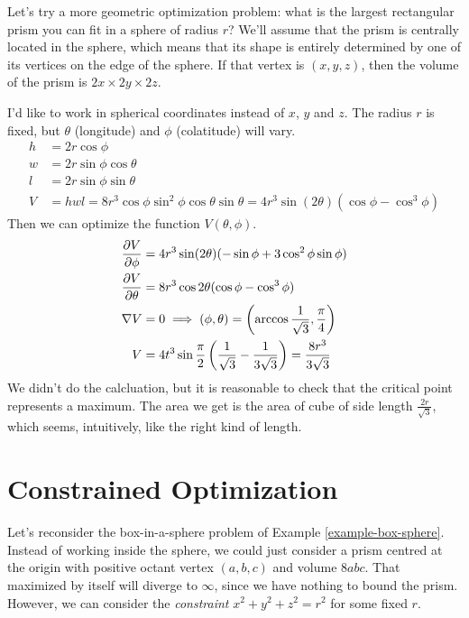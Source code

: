 \documentclass[fleqn,letterpaper]{report}
\begin{document}
\begin{example}
\label{example-box-sphere}
Let's try a more geometric optimization problem: what is the
largest rectangular prism you can fit in a sphere of radius
$r$? We'll assume that the prism is centrally located in the
sphere, which means that its shape is entirely determined by
one of its vertices on the edge of the sphere. If that vertex
is $(x,y,z)$, then the volume of the prism is $2x \times 2y
\times 2z$. 

I'd like to work in spherical coordinates instead of $x$, $y$
and $z$. The radius $r$ is fixed, but $\theta$ (longitude) and
$\phi$ (colatitude) will vary. 
\begin{align*}
h & = 2r \cos \phi \\
w & = 2r \sin \phi \cos \theta \\
l & = 2 r \sin \phi \sin \theta \\
V & = hwl = 8r^3 \cos \phi \sin^2 \phi \cos \theta \sin \theta
= 4 r^3 \sin (2\theta) (\cos \phi - \cos^3 \phi)
\end{align*}
Then we can optimize the function $V(\theta, \phi)$.
\begin{align*}
\frac{\partial V}{\partial \phi} & = 4r^3 \sin (2\theta) (- \sin \phi
+ 3 \cos^2 \phi \sin \phi) \\
\frac{\partial V}{\partial \theta} & = 8r^3 \cos 2 \theta (\cos \phi -
\cos^3 \phi) \\
\nabla V & = 0 \implies (\phi, \theta) = \left( \arccos
\frac{1}{\sqrt{3}}, \frac{\pi}{4} \right) \\
V & = 4t^3 \sin \frac{\pi}{2} \left( \frac{1}{\sqrt{3}} -
\frac{1}{3\sqrt{3}} \right) = \frac{8r^3}{3\sqrt{3}}
\end{align*}
We didn't do the calcluation, but it is reasonable to check that the
critical point represents a maximum. The area we get is the
area of cube of side length $\frac{2r}{\sqrt{3}}$, which
seems, intuitively, like the right kind of length. 
\end{example}

\section{Constrained Optimization}
\label{constrained-optimization}

Let's reconsider the box-in-a-sphere problem of Example
\ref{example-box-sphere}. Instead of
working inside the sphere, we could just consider a prism
centred at the origin with positive octant vertex $(a,b,c)$
and volume $8abc$. That maximized by itself will diverge to
$\infty$, since we have nothing to bound the prism. However,
we can consider the \emph{constraint} $x^2 + y^2 + z^2 = r^2$
for some fixed $r$. 
\end{document}
